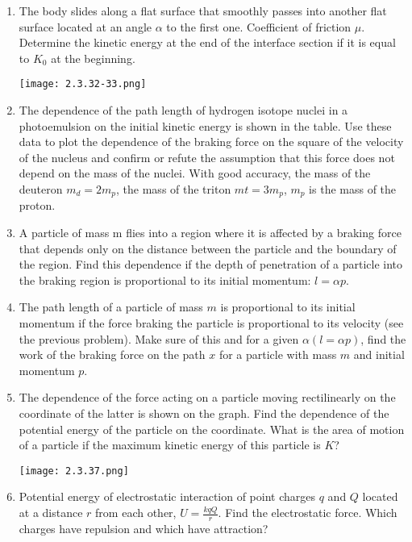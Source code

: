 \documentclass{article}
\begin{document}
\begin{enumerate}[label=2.3.\arabic*]
\item The body slides along a flat surface that smoothly passes into another flat surface located at an angle $\alpha$ to the first one. Coefficient of friction $\mu$. Determine the kinetic energy at the end of the interface section if it is equal to $K_0$ at the beginning.

\begin{center}
    \texttt{[image: 2.3.32-33.png]}
\end{center}


\item  The dependence of the path length of hydrogen isotope nuclei in a photoemulsion on the initial kinetic energy is shown in the table. Use these data to plot the dependence of the braking force on the square of the velocity of the nucleus and confirm or refute the assumption that this force does not depend on the mass of the nuclei. With good accuracy, the mass of the deuteron $m_d = 2m_p$, the mass of the triton $mt = 3m_p$, $m_p$ is the mass of the proton.

\item A particle of mass m flies into a region where it is affected by a braking force that depends only on the distance between the particle and the boundary of the region. Find this dependence if the depth of penetration of a particle into the braking region is proportional to its initial momentum: $l = \alpha p$.

\item The path length of a particle of mass $m$ is proportional to its initial momentum if the force braking the particle is proportional to its velocity (see the previous problem). Make sure of this and for a given $\alpha (l = \alpha p)$, find the work of the braking force on the path $x$ for a particle with mass $m$ and initial momentum $p$.

\item  The dependence of the force acting on a particle moving rectilinearly on the coordinate of the latter is shown on the graph. Find the dependence of the potential energy of the particle on the coordinate. What is the area of motion of a particle if the maximum kinetic energy of this particle is $K$?

\begin{center}
    \texttt{[image: 2.3.37.png]}
\end{center}


\item  Potential energy of electrostatic interaction of point charges $q$ and $Q$ located at a distance $r$ from each other, $U = \frac{kqQ}{r}$. Find the electrostatic force. Which charges have repulsion and which have attraction?


\end{enumerate}
\end{document}
